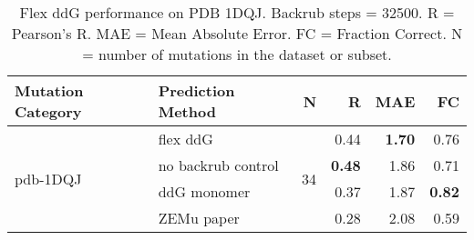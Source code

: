 \begin{table}
  \begin{tabular}{llrrrr}
\toprule
Mutation Category &   Prediction Method &   N &    R &  MAE &   FC \\
\midrule
 \multirow{ 4}{*}{pdb-1DQJ} & flex ddG & \multirow{ 4}{*}{34} & 0.44 & \textbf{1.70} & 0.76  \\
 & no backrub control & & \textbf{0.48} & 1.86 & 0.71  \\
 & ddG monomer & & 0.37 & 1.87 & \textbf{0.82}  \\
 & ZEMu paper & & 0.28 & 2.08 & 0.59  \\
\bottomrule
\end{tabular}
  \caption[Flex ddG performance on PDB 1DQJ]{
    Flex ddG performance on PDB 1DQJ. Backrub steps = 32500. R = Pearson's R. MAE = Mean Absolute Error. FC = Fraction Correct. N = number of mutations in the dataset or subset.
  } \label{tab:table-pdb-1DQJ}
\end{table}

